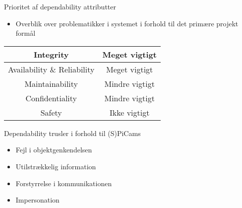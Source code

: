 \begin{frame}[fragile]{\insertsection}{Prioritet af dependability attributter}
  \begin{itemize}
    \item Overblik over problematikker i systemet i forhold til det primære projekt formål
  \end{itemize}
  \begin{center}
    \begin{tabular}{| c | c |}
      \hline
      Integrity & Meget vigtigt \\
      \hline
      Availability \& Reliability & Meget vigtigt \\
      \hline
      Maintainability & Mindre vigtigt \\
      \hline
      Confidentiality &  Mindre vigtigt\\
      \hline
      Safety & Ikke vigtigt \\
      \hline
    \end{tabular}
  \end{center}
\end{frame}

\begin{frame}[fragile]{\insertsection}{Dependability trusler i forhold til (S)PiCams}
  \begin{itemize}
    \item Fejl i objektgenkendelsen
    \item Utilstrækkelig information
    \item Forstyrrelse i kommunikationen
    \item Impersonation
  \end{itemize}
\end{frame}
